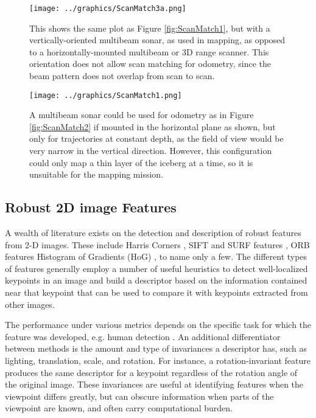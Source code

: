\begin{figure}[h]
   \centering
   \texttt{[image: ../graphics/ScanMatch3a.png]} %
   \caption{This shows the same plot as Figure \ref{fig:ScanMatch1}, but with a vertically-oriented multibeam sonar, as used in mapping, as opposed to a horizontally-mounted multibeam or 3D range scanner. This orientation does not allow scan matching for odometry, since the beam pattern does not overlap from scan to scan.}
   \label{fig:NoMatch}
\end{figure}

\begin{figure}[h]
   \centering
   \texttt{[image: ../graphics/ScanMatch1.png]} %
   \caption{A multibeam sonar could be used for odometry as in Figure \ref{fig:ScanMatch2} if mounted in the horizontal plane as shown, but only for trajectories at constant depth, as the field of view would be very narrow in the vertical direction. However, this configuration could only map a thin layer of the iceberg at a time, so it is unsuitable for the mapping mission.}
   \label{fig:ScanMatchMultibeam}
\end{figure}
%


\subsection{Robust 2D image Features}
\label{sec.2Dfeatures}

A wealth of literature exists on the detection and description of robust features from 2-D images. These include Harris Corners \cite{Harris1988}, SIFT and SURF features \cite{Lowe2004} \cite{Bay2006}, ORB features \cite{Rublee2011} Histogram of Gradients (HoG) \cite{Dalal2005}, to name only a few. The different types of features generally employ a number of useful heuristics to detect well-localized keypoints in an image and build a descriptor based on the information contained near that keypoint that can be used to compare it with keypoints extracted from other images. 

The performance under various metrics depends on the specific task for which the feature was developed, e.g. human detection \cite{Dalal2005}. An additional differentiator between methods is the amount and type of invariances a descriptor has, such as lighting, translation, scale, and rotation. For instance, a rotation-invariant feature produces the same descriptor for a keypoint regardless of the rotation angle of the original image. These invariances are useful at identifying features when the viewpoint differs greatly, but can obscure information when parts of the viewpoint are known, and often carry computational burden. 

